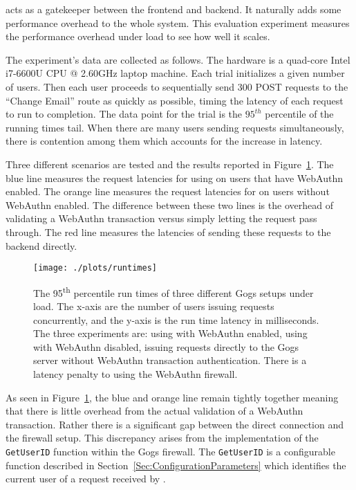 \sys{} acts as a gatekeeper between the frontend and backend. It naturally adds some performance overhead to the whole system. This evaluation experiment measures the performance overhead under load to see how well it scales. 

The experiment's data are collected as follows. The hardware is a quad-core Intel i7-6600U CPU @ 2.60GHz laptop machine. Each trial initializes a given number of users. Then each user proceeds to sequentially send 300 POST requests to the ``Change Email'' route as quickly as possible, timing the latency of each request to run to completion. The data point for the trial is the $95^{th}$ percentile of the running times tail. When there are many users sending requests simultaneously, there is contention among them which accounts for the increase in latency.

Three different scenarios are tested and the results reported in Figure~\ref{Fig:PerformanceOverhead}. The blue line measures the request latencies for using \sys{} on users that have WebAuthn enabled. The orange line measures the request latencies for \sys{} on users without WebAuthn enabled. The difference between these two lines is the overhead of validating a WebAuthn transaction versus simply letting the request pass through. The red line measures the latencies of sending these requests to the backend directly.

\begin{figure}[h]
  \centering
  \texttt{[image: ./plots/runtimes]}
  \caption{The 95\textsuperscript{th} percentile run times of three different Gogs setups under load. The x-axis are the number of users issuing requests concurrently, and the y-axis is the run time latency in milliseconds. The three experiments are: using \sys{} with WebAuthn enabled, using \sys{} with WebAuthn disabled, issuing requests directly to the Gogs server without WebAuthn transaction authentication. There is a latency penalty to using the WebAuthn firewall.}
  \label{Fig:PerformanceOverhead}
\end{figure}

As seen in Figure~\ref{Fig:PerformanceOverhead}, the blue and orange line remain tightly together meaning that there is little overhead from the actual validation of a WebAuthn transaction. Rather there is a significant gap between the direct connection and the firewall setup. This discrepancy arises from the implementation of the \lstinline{GetUserID} function within the Gogs firewall. The \lstinline{GetUserID} is a configurable function described in Section~\ref{Sec:ConfigurationParameters} which identifies the current user of a request received by \sys{}. 

